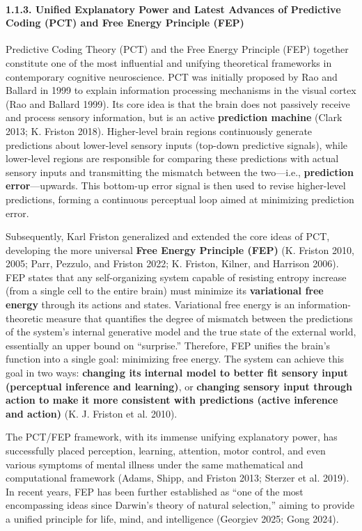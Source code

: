 \documentclass[
  a4paper]{article}
\begin{document}
\paragraph{1.1.3. Unified Explanatory Power and Latest Advances of
Predictive Coding (PCT) and Free Energy Principle
(FEP)}\label{unified-explanatory-power-and-latest-advances-of-predictive-coding-pct-and-free-energy-principle-fep}

Predictive Coding Theory (PCT) and the Free Energy Principle (FEP)
together constitute one of the most influential and unifying theoretical
frameworks in contemporary cognitive neuroscience. PCT was initially
proposed by Rao and Ballard in 1999 to explain information processing
mechanisms in the visual cortex (Rao and Ballard 1999). Its core idea is
that the brain does not passively receive and process sensory
information, but is an active \textbf{prediction machine} (Clark 2013;
K. Friston 2018). Higher-level brain regions continuously generate
predictions about lower-level sensory inputs (top-down predictive
signals), while lower-level regions are responsible for comparing these
predictions with actual sensory inputs and transmitting the mismatch
between the two---i.e., \textbf{prediction error}---upwards. This
bottom-up error signal is then used to revise higher-level predictions,
forming a continuous perceptual loop aimed at minimizing prediction
error.

Subsequently, Karl Friston generalized and extended the core ideas of
PCT, developing the more universal \textbf{Free Energy Principle (FEP)}
(K. Friston 2010, 2005; Parr, Pezzulo, and Friston 2022; K. Friston,
Kilner, and Harrison 2006). FEP states that any self-organizing system
capable of resisting entropy increase (from a single cell to the entire
brain) must minimize its \textbf{variational free energy} through its
actions and states. Variational free energy is an information-theoretic
measure that quantifies the degree of mismatch between the predictions
of the system's internal generative model and the true state of the
external world, essentially an upper bound on ``surprise.'' Therefore,
FEP unifies the brain's function into a single goal: minimizing free
energy. The system can achieve this goal in two ways: \textbf{changing
its internal model to better fit sensory input (perceptual inference and
learning)}, or \textbf{changing sensory input through action to make it
more consistent with predictions (active inference and action)} (K. J.
Friston et al. 2010).

The PCT/FEP framework, with its immense unifying explanatory power, has
successfully placed perception, learning, attention, motor control, and
even various symptoms of mental illness under the same mathematical and
computational framework (Adams, Shipp, and Friston 2013; Sterzer et al.
2019). In recent years, FEP has been further established as ``one of the
most encompassing ideas since Darwin's theory of natural selection,''
aiming to provide a unified principle for life, mind, and intelligence
(Georgiev 2025; Gong 2024).
\end{document}
